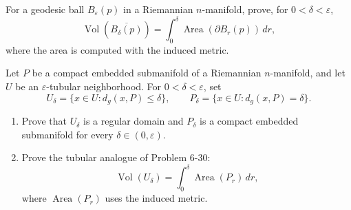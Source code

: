 \begin{exercise}
\label{prob:volume-geodesic-ball}

For a geodesic ball $B_\varepsilon(p)$ in a Riemannian $n$-manifold, prove,
for $0<\delta<\varepsilon$,
\[
\operatorname{Vol}(\overline{B_\delta(p)})
=\int_0^\delta\operatorname{Area}(\partial B_r(p))\,dr,
\]
where the area is computed with the induced metric.
\end{exercise}

\begin{exercise}
\label{prob:tubular-neighborhood-volume}

Let $P$ be a compact embedded submanifold of a Riemannian $n$-manifold, and
let $U$ be an $\varepsilon$-tubular neighborhood.  For $0<\delta<\varepsilon$,
set
\[
U_\delta=\{x\in U:d_g(x,P)\leq\delta\},
\qquad
P_\delta=\{x\in U:d_g(x,P)=\delta\}.
\]
\begin{enumerate}
\item[(a)] Prove that $U_\delta$ is a regular domain and $P_\delta$ is a
compact embedded submanifold for every $\delta\in(0,\varepsilon)$.
\item[(b)] Prove the tubular analogue of Problem 6-30:
\[
\operatorname{Vol}(U_\delta)=\int_0^\delta\operatorname{Area}(P_r)\,dr,
\]
where $\operatorname{Area}(P_r)$ uses the induced metric.
\end{enumerate}
\end{exercise}

